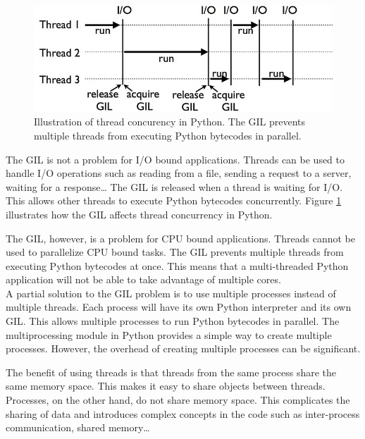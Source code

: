 \begin{spacing}{1.2}
    \begin{figure}
        \centering
        \includegraphics[width=\textwidth]{Chapitre4/figures/gil.png}
        \caption{Illustration of thread concurency in Python. The GIL prevents
            multiple threads from executing Python bytecodes in parallel.}
        \label{fig:gil}
    \end{figure}

    The GIL is not a problem for I/O bound applications. Threads can be used to handle I/O operations
    such as reading from a file, sending a request to a server, waiting for a response\dots
    The GIL is released when a thread is waiting for I/O. This allows other threads to execute Python
    bytecodes concurrently. Figure \ref{fig:gil} illustrates how the GIL affects thread concurrency in Python.


    The GIL, however, is a problem for CPU bound applications. Threads cannot be used to parallelize
    CPU bound tasks. The GIL prevents multiple threads from executing Python bytecodes at once.
    This means that a multi-threaded Python application will not be able to take advantage of multiple
    cores.\\

    A partial solution to the GIL problem is to use multiple processes instead of multiple threads.
    Each process will have its own Python interpreter and its own GIL. This allows multiple processes
    to run Python bytecodes in parallel. The multiprocessing module in Python provides a simple way
    to create multiple processes. However, the overhead of creating multiple processes can be significant.


    The benefit of using threads
    is that threads from the same process share the same memory space. This makes it easy to share objects
    between threads. Processes, on the other hand, do not share memory space. This complicates the sharing
    of data and introduces complex concepts in the code such as inter-process communication, shared memory\dots\\


\end{spacing}
